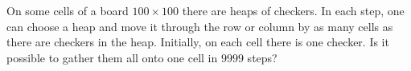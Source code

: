 \problem
On some cells of a board $100 \times 100$ there are heaps of checkers.
In each step, one can choose a heap and move it through the row or column by as
many cells as there are checkers in the heap.
Initially, on each cell there is one checker.
Is it possible to gather them all onto one cell in $9999$ steps?
\solution
\endproblem
